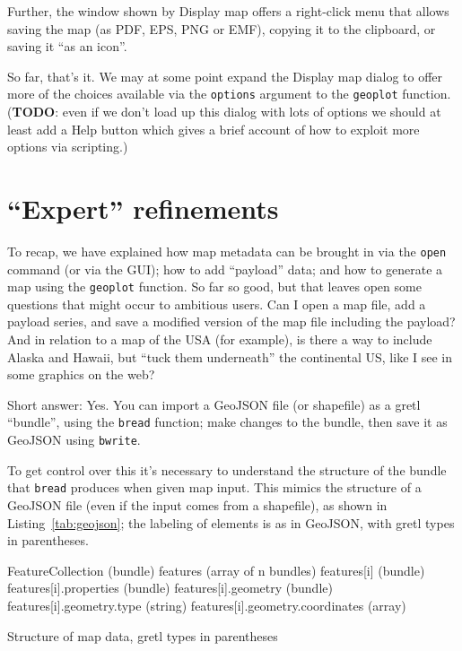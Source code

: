 \documentclass{article}
\begin{document}
Further, the window shown by \textsf{Display map} offers a right-click
menu that allows saving the map (as PDF, EPS, PNG or EMF), copying
it to the clipboard, or saving it ``as an icon''.

So far, that's it. We may at some point expand the \textsf{Display
  map} dialog to offer more of the choices available via the
\texttt{options} argument to the \texttt{geoplot}
function. (\textbf{TODO}: even if we don't load up this dialog with
lots of options we should at least add a \textsf{Help} button which
gives a brief account of how to exploit more options via scripting.)

\section{``Expert'' refinements}
\label{sec:expert}

To recap, we have explained how map metadata can be brought in via the
\texttt{open} command (or via the GUI); how to add ``payload'' data;
and how to generate a map using the \texttt{geoplot} function. So far
so good, but that leaves open some questions that might occur to
ambitious users.  Can I open a map file, add a payload series, and
save a modified version of the map file including the payload? And in
relation to a map of the USA (for example), is there a way to include
Alaska and Hawaii, but ``tuck them underneath'' the continental US,
like I see in some graphics on the web?

Short answer: Yes. You can import a GeoJSON file (or shapefile) as a
gretl ``bundle'', using the \texttt{bread} function; make changes to
the bundle, then save it as GeoJSON using \texttt{bwrite}.

To get control over this it's necessary to understand the structure of
the bundle that \texttt{bread} produces when given map input. This
mimics the structure of a GeoJSON file (even if the input comes from a
shapefile), as shown in Listing~\ref{tab:geojson}; the labeling of
elements is as in GeoJSON, with gretl types in parentheses.

\begin{script}[htbp]
\begin{scode}
FeatureCollection (bundle)
  features (array of n bundles)
    features[i] (bundle)
      features[i].properties (bundle)
      features[i].geometry   (bundle)
        features[i].geometry.type (string)
        features[i].geometry.coordinates (array)
\end{scode}
  \caption{Structure of map data, gretl types in parentheses}
  \label{tab:geojson}
\end{script}
\end{document}
